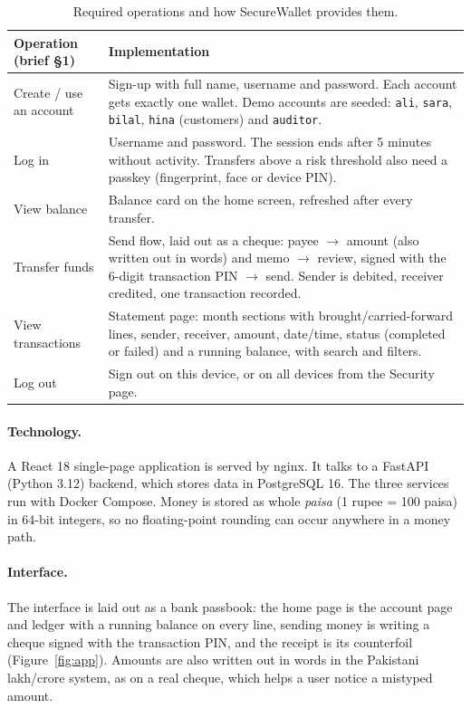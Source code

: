 \documentclass[11pt,a4paper]{article}
\newcommand{\code}[1]{\texttt{#1}}
\begin{document}
\begin{table}[H]
\centering\small
\caption{Required operations and how SecureWallet provides them.}
\label{tab:ops}
\begin{tabularx}{\textwidth}{P{4.2cm}Y}
\toprule
Operation (brief \S1) & Implementation \\
\midrule
Create / use an account & Sign-up with full name, username and password. Each account gets exactly one wallet. Demo accounts are seeded: \code{ali}, \code{sara}, \code{bilal}, \code{hina} (customers) and \code{auditor}. \\
Log in & Username and password. The session ends after 5 minutes without activity. Transfers above a risk threshold also need a passkey (fingerprint, face or device PIN). \\
View balance & Balance card on the home screen, refreshed after every transfer. \\
Transfer funds & Send flow, laid out as a cheque: payee $\rightarrow$ amount (also written out in words) and memo $\rightarrow$ review, signed with the 6-digit transaction PIN $\rightarrow$ send. Sender is debited, receiver credited, one transaction recorded. \\
View transactions & Statement page: month sections with brought/carried-forward lines, sender, receiver, amount, date/time, status (completed or failed) and a running balance, with search and filters. \\
Log out & Sign out on this device, or on all devices from the Security page. \\
\bottomrule
\end{tabularx}
\end{table}

\paragraph{Technology.} A React 18 single-page application is served by nginx. It talks to a FastAPI (Python 3.12) backend, which stores data in PostgreSQL 16. The three services run with Docker Compose. Money is stored as whole \emph{paisa} (1 rupee = 100 paisa) in 64-bit integers, so no floating-point rounding can occur anywhere in a money path.

\paragraph{Interface.} The interface is laid out as a bank passbook: the home page is the account page and ledger with a running balance on every line, sending money is writing a cheque signed with the transaction PIN, and the receipt is its counterfoil (Figure~\ref{fig:app}). Amounts are also written out in words in the Pakistani lakh/crore system, as on a real cheque, which helps a user notice a mistyped amount.
\end{document}
